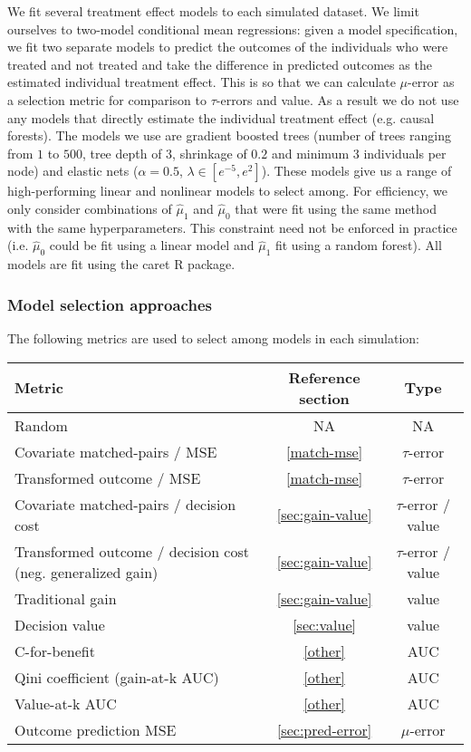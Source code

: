 We fit several treatment effect models to each simulated dataset. We limit ourselves to two-model conditional mean regressions: given a model specification, we fit two separate models to predict the outcomes of the individuals who were treated and not treated and take the difference in predicted outcomes as the estimated individual treatment effect. This is so that we can calculate $\mu$-error as a selection metric for comparison to $\tau$-errors and value. As a result we do not use any models that directly estimate the individual treatment effect (e.g. causal forests). The models we use are gradient boosted trees (number of trees ranging from $1$ to $500$, tree depth of $3$, shrinkage of $0.2$ and minimum $3$ individuals per node) and elastic nets ($\alpha=0.5$, $\lambda \in [e^{-5}, e^2]$). These models give us a range of high-performing linear and nonlinear models to select among. For efficiency, we only consider combinations of $\hat\mu_1$ and $\hat\mu_0$ that were fit using the same method with the same hyperparameters. This constraint need not be enforced in practice (i.e. $\hat\mu_0$ could be fit using a linear model and $\hat\mu_1$ fit using a random forest). All models are fit using the caret R package.

\subsubsection{Model selection approaches}

The following metrics are used to select among models in each simulation:


\begin{center}
\begin{tabu}{|m{6cm}|c|c|}
	\hline
	 \rowfont[c]{\bfseries} Metric & Reference section & Type \\
	 \hline
	 Random & NA &  NA \\
	 \hline
	 Covariate matched-pairs / MSE & \ref{match-mse} & $\tau$-error \\
	 Transformed outcome / MSE & \ref{match-mse} & $\tau$-error \\
	 Covariate matched-pairs / decision cost &  \ref{sec:gain-value} & $\tau$-error / value \\
	 Transformed outcome / decision cost (neg. generalized gain) & \ref{sec:gain-value} & $\tau$-error / value \\
	 \hline
	 Traditional gain &  \ref{sec:gain-value} & value \\ 
	 Decision value &  \ref{sec:value} & value \\
	 \hline
	 C-for-benefit &  \ref{other} & AUC \\
	 Qini coefficient (gain-at-k AUC) &  \ref{other} & AUC \\
	 Value-at-k AUC &  \ref{other} & AUC \\
	 \hline
	 Outcome prediction MSE &  \ref{sec:pred-error} & $\mu$-error \\
	 \hline
\end{tabu}
\end{center}

